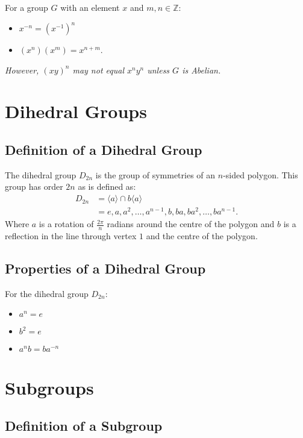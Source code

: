 \documentclass[a4paper, 12pt, twoside]{article}
\begin{document}
For a group $G$ with an element $x$ and $m, n \in \mathbb{Z}$:

\begin{itemize}
      \item $x^{-n} = (x^{-1})^n$
      \item $(x^n)(x^m) = x^{n + m}$.
\end{itemize}

\textit{However, $(xy)^n$ may not equal $x^ny^n$ unless $G$ is Abelian.}

\section{Dihedral Groups}

\subsection{Definition of a Dihedral Group}

The dihedral group $D_{2n}$ is the group of symmetries of an $n$-sided polygon.
This group has order $2n$ as is defined as:
\begin{align*}
      D_{2n} & = \langle a \rangle \cap b\langle a \rangle                        \\
             & = {e, a, a^2, \ldots, a^{n - 1}, b, ba, ba^2, \ldots, ba^{n - 1}}.
\end{align*}
Where $a$ is a rotation of $\frac{2\pi}{n}$ radians around the centre of the
polygon and $b$ is a reflection in the line through vertex $1$ and the centre
of the polygon.

\subsection{Properties of a Dihedral Group}

For the dihedral group $D_{2n}$:

\begin{itemize}
      \item $a^n = e$
      \item $b^2 = e$
      \item $a^nb = ba^{-n}$
\end{itemize}

\section{Subgroups}

\subsection{Definition of a Subgroup}
\end{document}
